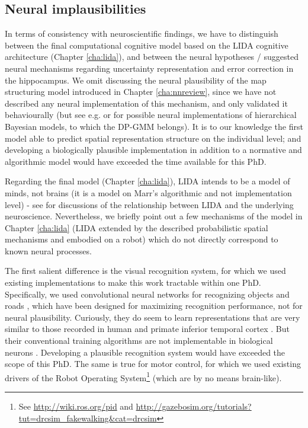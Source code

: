 \subsection{Neural implausibilities}

In terms of consistency with neuroscientific findings, we have to distinguish between the final computational cognitive model based on the LIDA cognitive architecture (Chapter \ref{cha:lida}), and between the neural hypotheses / suggested neural mechanisms regarding uncertainty representation and error correction in the hippocampus. We omit discussing the neural plausibility of the map structuring model introduced in Chapter \ref{cha:nnreview}, since we have not described any neural implementation of this mechanism, and only validated it behaviourally (but see e.g. \citep{shi2009neural} or \citep{sanborn2015types} for possible neural implementations of hierarchical Bayesian models, to which the DP-GMM belongs). It is to our knowledge the first model able to predict spatial representation structure on the individual level; and developing a biologically plausible implementation in addition to a normative and algorithmic model would have exceeded the time available for this PhD.

Regarding the final model (Chapter \ref{cha:lida}), LIDA intends to be a model of minds, not brains (it is a model on Marr's algorithmic and not implementation level) - see \citep{franklin2012global, franklin2013lida} for discussions of the relationship between LIDA and the underlying neuroscience. Nevertheless, we briefly point out a few mechanisms of the model in Chapter \ref{cha:lida} (LIDA extended by the described probabilistic spatial mechanisms and embodied on a robot) which do not directly correspond to known neural processes. 

The first salient difference is the visual recognition system, for which we used existing implementations to make this work tractable within one PhD. Specifically, we used convolutional neural networks for recognizing objects \citep{szegedy2014going} and roads \citep{brust2015convolutional}, which have been designed for maximizing recognition performance, not for neural plausibility. Curiously, they do seem to learn representations that are very similar to those recorded in human and primate inferior temporal cortex \citep{khaligh2014deep, yamins2013hierarchical}. But their conventional training algorithms are not implementable in biological neurons \citep{stork1989backpropagation, bengio2015towards}. Developing a plausible recognition system would have exceeded the scope of this PhD. The same is true for motor control, for which we used existing drivers of the Robot Operating System\footnote{See \url{http://wiki.ros.org/pid} and \url{http://gazebosim.org/tutorials?tut=drcsim_fakewalking&cat=drcsim}} (which are by no means brain-like).

